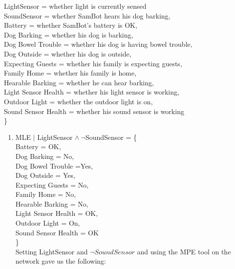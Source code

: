 \documentclass{article}
\begin{document}
\begin{enumerate}
			\indent LightSensor = whether light is currently sensed \\
			\indent SoundSensor = whether SamBot hears his dog barking,\\
			\indent Battery = whether SamBot's battery is OK, \\
			\indent Dog Barking = whether his dog is barking, \\
			\indent Dog Bowel Trouble = whether his dog is having bowel trouble, \\
			\indent Dog Outside = whether his dog is outside, \\
			\indent Expecting Guests = whether his family is expecting guests, \\
			\indent Family Home = whether his family is home, \\
			\indent Hearable Barking = whether he can hear barking, \\
			\indent Light Sensor Health = whether his light sensor is working, \\
			\indent Outdoor Light = whether the outdoor light is on, \\
			\indent Sound Sensor Health = whether his sound sensor is working \\
			\}\\		
		\begin{enumerate}
			\item MLE $|$ LightSensor $\land \ \neg$SoundSensor = \{\\
				\indent Battery = OK, \\
				\indent Dog Barking = No, \\
				\indent Dog Bowel Trouble =Yes, \\
				\indent Dog Outside = Yes, \\
				\indent Expecting Guests = No, \\
				\indent Family Home = No, \\
				\indent Hearable Barking = No, \\
				\indent Light Sensor Health = OK, \\
				\indent Outdoor Light = On, \\
				\indent Sound Sensor Health = OK \\
				\} \\
				Setting LightSensor and $\neg SoundSensor$ and using the MPE
					tool on the network gave us the following:
				\begin{figure}[H]
					\centering

\end{figure}
\end{enumerate}
\end{enumerate}
\end{document}
